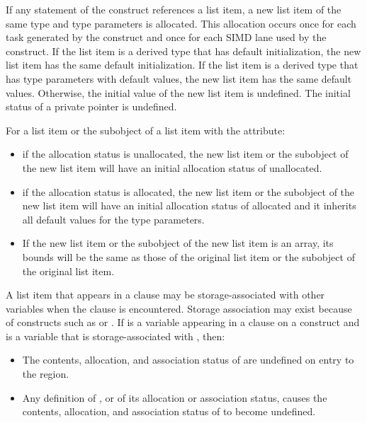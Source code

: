 \begin{fortranspecific}
If any statement of the construct references a list item, a new list
item of the same type and type parameters is allocated. This
allocation occurs once for each task generated by the construct and
once for each SIMD lane used by the construct. If the list item is a
derived type that has default initialization, the new list item has
the same default initialization.  If the list item is a derived type
that has type parameters with default values, the new list item has
the same default values.  Otherwise, the initial value of the new list item is
undefined. The initial status of a private pointer is undefined.

For a list item or the subobject of a list item with the  attribute:

\begin{itemize}
\item if the allocation status is unallocated, the new list item or the subobject
of the new list item will have an initial allocation status of unallocated.

\item if the allocation status is allocated, the new list item or the subobject of
the new list item will have an initial allocation status of allocated
and it inherits all default values for the type parameters.

\item If the new list item or the subobject of the new list item is an array, its bounds will be
the same as those of the original list item or the subobject of the original list item.
\end{itemize}

A list item that appears in a  clause may be storage-associated with other
variables when the  clause is encountered. Storage association may exist
because of constructs such as  or . If  is a variable appearing
in a  clause on a construct and  is a variable that is storage-associated with , then:

\begin{itemize}
\item The contents, allocation, and association status of  are undefined on entry to the region.

\item Any definition of , or of its allocation or association status, causes the contents,
allocation, and association status of  to become undefined.


\end{itemize}
\end{fortranspecific}
